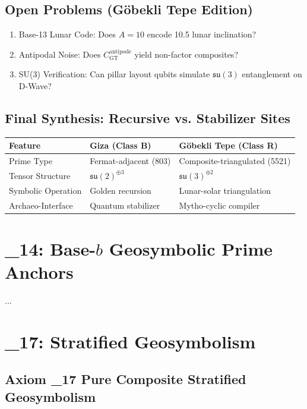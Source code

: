 \documentclass[12]{amsart}
\theoremstyle{plain}
\begin{document}
\subsection{Open Problems (G\"{o}bekli Tepe Edition)}
\begin{enumerate}
    \item Base-13 Lunar Code: Does $A = 10$ encode 10.5\degree{} lunar inclination?
    \item Antipodal Noise: Does $C_{\text{GT}}^{\text{antipode}}$ yield non-factor composites?
    \item SU(3) Verification: Can pillar layout qubits simulate $\mathfrak{su}(3)$ entanglement on D-Wave?
\end{enumerate}

\subsection{Final Synthesis: Recursive vs. Stabilizer Sites}
\begin{center}
\begin{tabular}{|l|l|l|}
\hline
\textbf{Feature} & \textbf{Giza (Class B)} & \textbf{G\"{o}bekli Tepe (Class R)} \\
\hline
Prime Type & Fermat-adjacent (803) & Composite-triangulated (5521) \\
Tensor Structure & $\mathfrak{su}(2)^{\oplus 3}$ & $\mathfrak{su}(3)^{\oplus 2}$ \\
Symbolic Operation & Golden recursion & Lunar-solar triangulation \\
Archaeo-Interface & Quantum stabilizer & Mytho-cyclic compiler \\
\hline
\end{tabular}
\end{center}

\section{\Xi_{14}: Base-$b$ Geosymbolic Prime Anchors}
...

\section{\Xi_{17}: Stratified Geosymbolism}

\subsection{Axiom \Xi_{17} \textendash{} Pure Composite Stratified Geosymbolism}
\end{document}
